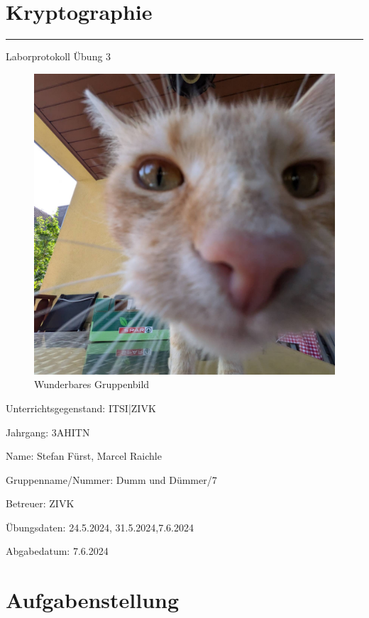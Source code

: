 \documentclass[a4paper]{article}
\begin{document}

\pagestyle{oida}
\section*{Kryptographie}
\par\noindent\rule{\textwidth}{0.4pt}

Laborprotokoll
Übung 3

\begin{figure}[h]
	\includegraphics[scale=0.3]{images/mika.jpeg}
	\caption{Wunderbares Gruppenbild}
\end{figure}

\vspace*{\fill}
Unterrichtsgegenstand:	ITSI|ZIVK

Jahrgang:	3AHITN

Name:	Stefan Fürst, Marcel Raichle

Gruppenname/Nummer: Dumm und Dümmer/7

Betreuer: 	ZIVK

Übungsdaten:	24.5.2024, 31.5.2024,7.6.2024

Abgabedatum:	7.6.2024


\newpage
\tableofcontents

\newpage

\section{Aufgabenstellung}
\end{document}
